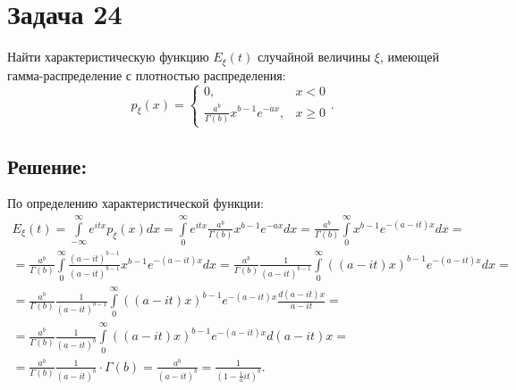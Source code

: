 \documentclass[12pt]{article}
\begin{document}
    \section*{Задача 24}

    Найти характеристическую функцию $E_\xi(t)$ случайной величины $\xi$, имеющей гамма-распределение с плотностью распределения:
    \[
        p_\xi(x)
        =
        \left \{
        \begin{array}{ll}
            0,                                     & x < 0   \\
            \frac{a^b}{\Gamma(b)} x^{b-1} e^{-ax}, & x \ge 0
        \end{array}
        \right .
        .
    \]

    \subsection*{Решение:}
    По определению характеристической функции:
    \begin{multline*}
        E_\xi(t)
        = \int \limits_{-\infty}^\infty e^{itx} p_\xi(x) dx
        = \int \limits_0^\infty e^{itx} \frac{a^b}{\Gamma(b)} x^{b-1} e^{-ax} dx
        = \frac{a^b}{\Gamma(b)} \int \limits_0^\infty x^{b-1} e^{- \left ( a - it \right ) x} dx = \\
        = \frac{a^b}{\Gamma(b)} \int \limits_0^\infty \frac{\left ( a - it \right )^{b-1}}{\left ( a - it \right )^{b-1}} x^{b-1} e^{- \left ( a - it \right ) x} dx
        = \frac{a^b}{\Gamma(b)} \frac{1}{\left ( a - it \right )^{b-1}} \int \limits_0^\infty \left ( \left ( a - it \right ) x \right )^{b-1} e^{- (a - it) x} dx = \\
        = \frac{a^b}{\Gamma(b)} \frac{1}{\left ( a - it \right )^{b-1}} \int \limits_0^\infty \left ( \left ( a - it \right ) x \right )^{b-1} e^{- (a - it) x} \frac{d \left ( a - it \right )x}{a - it} = \\
        = \frac{a^b}{\Gamma(b)} \frac{1}{\left ( a - it \right )^b} \int \limits_0^\infty \left ( \left ( a - it \right ) x \right )^{b-1} e^{- (a - it) x} d \left ( a - it \right )x = \\
        = \frac{a^b}{\Gamma(b)} \frac{1}{\left ( a - it \right )^b} \cdot \Gamma(b)
        = \frac{a^b}{\left ( a - it \right )^b}
        = \frac{1}{\left ( 1 - \frac{1}{a} i t \right )^b} .
    \end{multline*}
\end{document}
